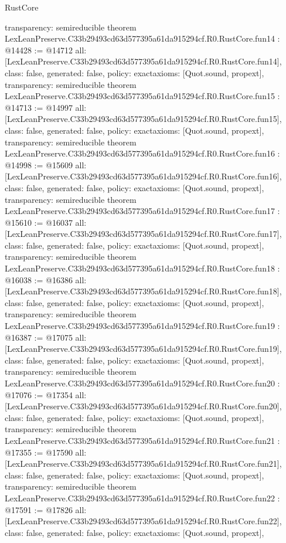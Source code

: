 \begin{lexlean}{RustCore}
\begin{coremodule}
{  transparency: semireducible
}
theorem LexLeanPreserve.C33b29493cd63d577395a61da915294cf.R0.RustCore.fun14 : @14428 := @14712 {
  all: [LexLeanPreserve.C33b29493cd63d577395a61da915294cf.R0.RustCore.fun14],
  class: false,
  generated: false,
  policy: exact{axioms: [Quot.sound, propext]},
  transparency: semireducible
}
theorem LexLeanPreserve.C33b29493cd63d577395a61da915294cf.R0.RustCore.fun15 : @14713 := @14997 {
  all: [LexLeanPreserve.C33b29493cd63d577395a61da915294cf.R0.RustCore.fun15],
  class: false,
  generated: false,
  policy: exact{axioms: [Quot.sound, propext]},
  transparency: semireducible
}
theorem LexLeanPreserve.C33b29493cd63d577395a61da915294cf.R0.RustCore.fun16 : @14998 := @15609 {
  all: [LexLeanPreserve.C33b29493cd63d577395a61da915294cf.R0.RustCore.fun16],
  class: false,
  generated: false,
  policy: exact{axioms: [Quot.sound, propext]},
  transparency: semireducible
}
theorem LexLeanPreserve.C33b29493cd63d577395a61da915294cf.R0.RustCore.fun17 : @15610 := @16037 {
  all: [LexLeanPreserve.C33b29493cd63d577395a61da915294cf.R0.RustCore.fun17],
  class: false,
  generated: false,
  policy: exact{axioms: [Quot.sound, propext]},
  transparency: semireducible
}
theorem LexLeanPreserve.C33b29493cd63d577395a61da915294cf.R0.RustCore.fun18 : @16038 := @16386 {
  all: [LexLeanPreserve.C33b29493cd63d577395a61da915294cf.R0.RustCore.fun18],
  class: false,
  generated: false,
  policy: exact{axioms: [Quot.sound, propext]},
  transparency: semireducible
}
theorem LexLeanPreserve.C33b29493cd63d577395a61da915294cf.R0.RustCore.fun19 : @16387 := @17075 {
  all: [LexLeanPreserve.C33b29493cd63d577395a61da915294cf.R0.RustCore.fun19],
  class: false,
  generated: false,
  policy: exact{axioms: [Quot.sound, propext]},
  transparency: semireducible
}
theorem LexLeanPreserve.C33b29493cd63d577395a61da915294cf.R0.RustCore.fun20 : @17076 := @17354 {
  all: [LexLeanPreserve.C33b29493cd63d577395a61da915294cf.R0.RustCore.fun20],
  class: false,
  generated: false,
  policy: exact{axioms: [Quot.sound, propext]},
  transparency: semireducible
}
theorem LexLeanPreserve.C33b29493cd63d577395a61da915294cf.R0.RustCore.fun21 : @17355 := @17590 {
  all: [LexLeanPreserve.C33b29493cd63d577395a61da915294cf.R0.RustCore.fun21],
  class: false,
  generated: false,
  policy: exact{axioms: [Quot.sound, propext]},
  transparency: semireducible
}
theorem LexLeanPreserve.C33b29493cd63d577395a61da915294cf.R0.RustCore.fun22 : @17591 := @17826 {
  all: [LexLeanPreserve.C33b29493cd63d577395a61da915294cf.R0.RustCore.fun22],
  class: false,
  generated: false,
  policy: exact{axioms: [Quot.sound, propext]},
}
\end{coremodule}
\end{lexlean}
